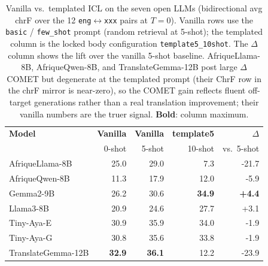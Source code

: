 \begin{table}[t]
\centering
\small
\renewcommand{\arraystretch}{1.05}
\begin{tabular}{lrrrr}
\toprule
\textbf{Model} & \textbf{Vanilla} & \textbf{Vanilla} & \textbf{template5} & \textbf{$\Delta$} \\
  & 0-shot & 5-shot & 10-shot & vs.\ 5-shot \\
\midrule
AfriqueLlama-8B & 25.0 & 29.0 & 7.3 & -21.7 \\
AfriqueQwen-8B & 11.3 & 17.9 & 12.0 & -5.9 \\
Gemma2-9B & 26.2 & 30.6 & \textbf{34.9} & \textbf{+4.4} \\
Llama3-8B & 20.9 & 24.6 & 27.7 & +3.1 \\
Tiny-Aya-E & 30.9 & 35.9 & 34.0 & -1.9 \\
Tiny-Aya-G & 30.8 & 35.6 & 33.8 & -1.9 \\
TranslateGemma-12B & \textbf{32.9} & \textbf{36.1} & 12.2 & -23.9 \\
\bottomrule
\end{tabular}
\caption{Vanilla vs.\ templated ICL on the seven open LLMs (bidirectional avg chrF over the 12 \texttt{eng}$\leftrightarrow$\texttt{xxx} pairs at $T{=}0$). Vanilla rows use the \texttt{basic} / \texttt{few\_shot} prompt (random retrieval at 5-shot); the templated column is the locked body configuration \texttt{template5\_10shot}. The $\Delta$ column shows the lift over the vanilla 5-shot baseline. AfriqueLlama-8B, AfriqueQwen-8B, and TranslateGemma-12B post large $\Delta$ COMET but degenerate at the templated prompt (their ChrF row in the chrF mirror is near-zero), so the COMET gain reflects fluent off-target generations rather than a real translation improvement; their vanilla numbers are the truer signal. \textbf{Bold}: column maximum.}
\label{tab:prompt_engineering_open_chrf}
\end{table}
